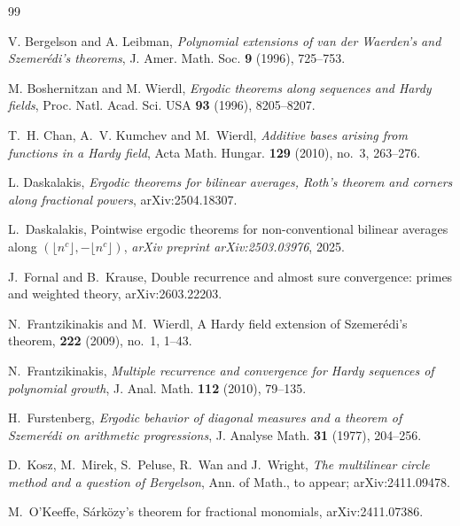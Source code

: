 \documentclass{amsart}
\newcommand{\1}{\mathbf 1}
\begin{document}
\begin{thebibliography}{99}
\footnotesize
\raggedright

V. Bergelson and A. Leibman,
\emph{Polynomial extensions of van der Waerden's and Szemer\'edi's
theorems},
J. Amer. Math. Soc. \textbf{9} (1996), 725--753.

M. Boshernitzan and M. Wierdl,
\emph{Ergodic theorems along sequences and Hardy fields},
Proc. Natl. Acad. Sci. USA \textbf{93} (1996), 8205--8207.

T.~H. Chan, A.~V. Kumchev and M.~Wierdl,
\emph{Additive bases arising from functions in a Hardy field},
Acta Math. Hungar. \textbf{129} (2010), no.~3, 263--276.

L. Daskalakis,
\emph{Ergodic theorems for bilinear averages, Roth's theorem and
corners along fractional powers},
arXiv:2504.18307.



L.~Daskalakis,
\newblock Pointwise ergodic theorems for non-conventional bilinear
averages along
$(\lfloor n^c\rfloor,-\lfloor n^c\rfloor)$,
\newblock \emph{arXiv preprint arXiv:2503.03976}, 2025.

J.~Fornal and B.~Krause,
\newblock Double recurrence and almost sure convergence: primes and
weighted theory,
\newblock arXiv:2603.22203.

N.~Frantzikinakis and M.~Wierdl,
\newblock A Hardy field extension of Szemer\'edi's theorem,
 {\bf 222} (2009), no.~1, 1--43.

N.~Frantzikinakis,
\emph{Multiple recurrence and convergence for Hardy sequences of
polynomial growth},
J. Anal. Math. \textbf{112} (2010), 79--135.

H.~Furstenberg,
\emph{Ergodic behavior of diagonal measures and a theorem of
Szemer\'edi on arithmetic progressions},
J. Analyse Math. \textbf{31} (1977), 204--256.



D.~Kosz, M.~Mirek, S.~Peluse, R.~Wan and J.~Wright,
\emph{The multilinear circle method and a question of Bergelson},
Ann. of Math., to appear; arXiv:2411.09478.


M.~O'Keeffe,
\newblock S\'ark\"ozy's theorem for fractional monomials,
\newblock arXiv:2411.07386.


\end{thebibliography}
\end{document}

